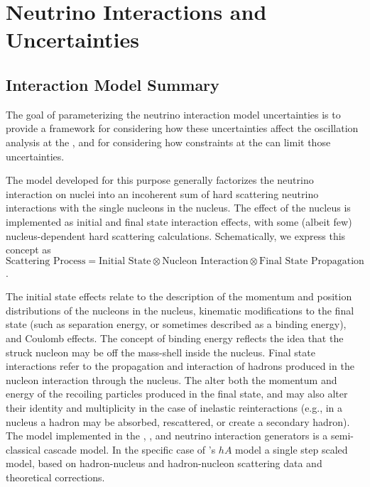 \section{Neutrino Interactions and Uncertainties}\label{sec:nu-osc-05} %

\subsection{Interaction Model Summary}


The goal of parameterizing the neutrino interaction model uncertainties is to provide a framework for considering how these uncertainties affect the oscillation analysis at the , and for considering how constraints at the  can limit those uncertainties.
 
The model developed for this purpose generally factorizes the neutrino interaction on nuclei into an incoherent sum of hard scattering neutrino interactions with the single nucleons in the nucleus. The effect of the nucleus is implemented as initial and final state interaction effects, with some (albeit few) nucleus-dependent hard scattering calculations. Schematically, we express this concept as $\text{Scattering Process} = \text{Initial State} \otimes \text{Nucleon Interaction} \otimes \text{Final State Propagation}$.

The initial state effects relate to the description of the momentum and position distributions of the nucleons in the nucleus, kinematic modifications to the final state (such as separation energy, or sometimes described as a binding energy), and Coulomb effects.   The concept of binding energy reflects the idea that the struck nucleon may be off the mass-shell inside the nucleus.
Final state interactions refer to the propagation and interaction of hadrons produced in the nucleon interaction through the nucleus. The  alter both the momentum and energy of the recoiling particles produced in the final state, and may also alter their identity and multiplicity in the case of inelastic reinteractions (e.g., in a nucleus a hadron may be absorbed, rescattered, or create a secondary hadron).  The  model implemented in the , , and  neutrino interaction generators is a semi-classical cascade model. In the specific case of 's $hA$ model a single step scaled model, based on hadron-nucleus and hadron-nucleon scattering data and theoretical corrections. %

